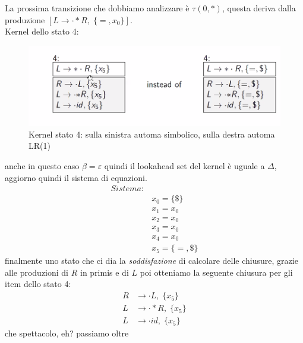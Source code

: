 \documentclass[class=book, crop=false, oneside, 12pt]{standalone}
\begin{document}
La prossima transizione che dobbiamo analizzare è \(\tau(0,*)\), questa deriva dalla produzione \([L \to \cdot *R, \; \{=, x_0\}]\).
\\
Kernel dello stato 4:
\begin{figure}
    \centering
    \includegraphics[width=.7\textwidth]{ex_automa_simbolico-kernel_s4.png}
    \caption{Kernel stato 4: sulla sinistra automa simbolico, sulla destra automa LR(1)}
\end{figure}
anche in questo caso  \(\beta = \varepsilon\) quindi il lookahead set del kernel è uguale a \(\Delta\), aggiorno quindi il sistema di equazioni.
\begin{align*}
    Sistema:& \\
            & x_0 = \{\$\} \\
            & x_1 = x_0 \\
            & x_2 = x_0 \\
            & x_3 = x_0 \\
            & x_4 = x_0 \\
            & x_5 = \{=, \$\}
\end{align*}
finalmente uno stato che ci dia la \emph{soddisfazione} di calcolare delle chiusure, grazie alle produzioni di \(R\) in primis e di \(L\) poi otteniamo la seguente chiusura per gli item dello stato 4:
\begin{align*}
    R &\to \cdot L, \; \{x_5\} \\
    L &\to \cdot *R, \; \{x_5\} \\
    L &\to \cdot id, \; \{x_5\}
\end{align*}
che spettacolo, eh? passiamo oltre
\end{document}
